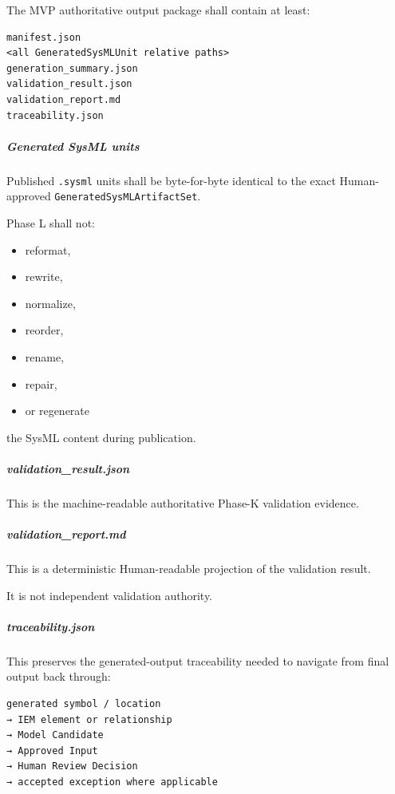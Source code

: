 The MVP authoritative output package shall contain at least:

\begin{verbatim}
manifest.json
<all GeneratedSysMLUnit relative paths>
generation_summary.json
validation_result.json
validation_report.md
traceability.json
\end{verbatim}

\hypertarget{generated-sysml-units}{%
\subparagraph{Generated SysML units}\label{generated-sysml-units}}

Published \texttt{.sysml} units shall be byte-for-byte identical to the exact Human-approved \texttt{GeneratedSysMLArtifactSet}.

Phase L shall not:

\begin{itemize}
\tightlist
\item
  reformat,
\item
  rewrite,
\item
  normalize,
\item
  reorder,
\item
  rename,
\item
  repair,
\item
  or regenerate
\end{itemize}

the SysML content during publication.

\hypertarget{validation_resultjson}{%
\subparagraph{validation\_result.json}\label{validation_resultjson}}

This is the machine-readable authoritative Phase-K validation evidence.

\hypertarget{validation_reportmd}{%
\subparagraph{validation\_report.md}\label{validation_reportmd}}

This is a deterministic Human-readable projection of the validation result.

It is not independent validation authority.

\hypertarget{traceabilityjson}{%
\subparagraph{traceability.json}\label{traceabilityjson}}

This preserves the generated-output traceability needed to navigate from final output back through:

\begin{verbatim}
generated symbol / location
→ IEM element or relationship
→ Model Candidate
→ Approved Input
→ Human Review Decision
→ accepted exception where applicable
\end{verbatim}

